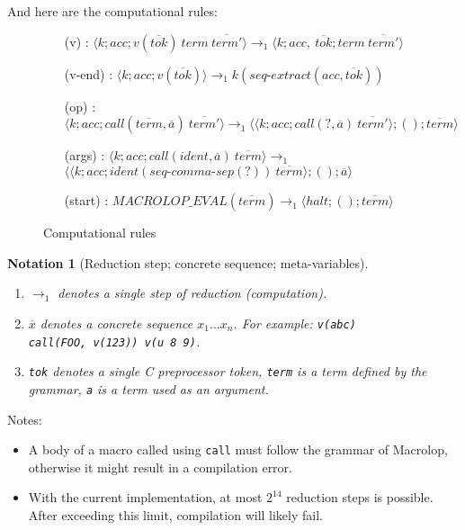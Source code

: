\documentclass[12pt]{article}
\theoremstyle{break}
\newtheorem{notation}{Notation}
\begin{document}
And here are the computational rules:

\begin{figure}[H]
    \caption{Computational rules}

    \small
    \begin{itemize}
        \item[(v)]: $\langle k; acc; v(\overline{tok}) \ term \ \overline{term'} \rangle \to_1
            \langle k; acc, \ \overline{tok}; term \ \overline{term'} \rangle$
        \item[(v-end)]: $\langle k; acc; v(\overline{tok}) \rangle \to_1
            k(seq\mbox{-}extract(acc, \overline{tok}))$
        \item[(op)]: $\langle k; acc; call(\overline{term}, \overline{a}) \ \overline{term'} \rangle \to_1
            \langle \langle k; acc; call(?, \overline{a}) \ \overline{term'} \rangle; (); \overline{term} \rangle$
        \item[(args)]: $\langle k; acc; call(ident, \overline{a}) \ \overline{term} \rangle \to_1$ \\
            $\langle \langle k; acc; ident(seq\mbox{-}comma\mbox{-}sep(?)) \ \overline{term} \rangle; (); \overline{a} \rangle$
        \item[(start)]: $MACROLOP\_EVAL(\overline{term}) \to_1
            \langle halt; (); \overline{term} \rangle$
    \end{itemize}
    \normalsize
\end{figure}

\begin{notation}[Reduction step; concrete sequence; meta-variables]
    \begin{enumerate}
        \item $\to_1$ denotes a single step of reduction (computation).

        \item $\overline{x}$ denotes a concrete sequence $x_1 \ldots x_n$. For example:
        \texttt{v(abc) \\ call(FOO, v(123)) v(u 8 9)}.

        \item \texttt{tok} denotes a single C preprocessor token, \texttt{term} is a term defined
    by the grammar, \texttt{a} is a term used as an argument.
    \end{enumerate}
\end{notation}

Notes:

\begin{itemize}
    \item A body of a macro called using \texttt{call} must follow the grammar of
    Macrolop, otherwise it might result in a compilation error.
    \item With the current implementation, at most $2^{14}$ reduction steps is
    possible. After exceeding this limit, compilation will likely fail.
\end{itemize}

\printbibliography
\end{document}
